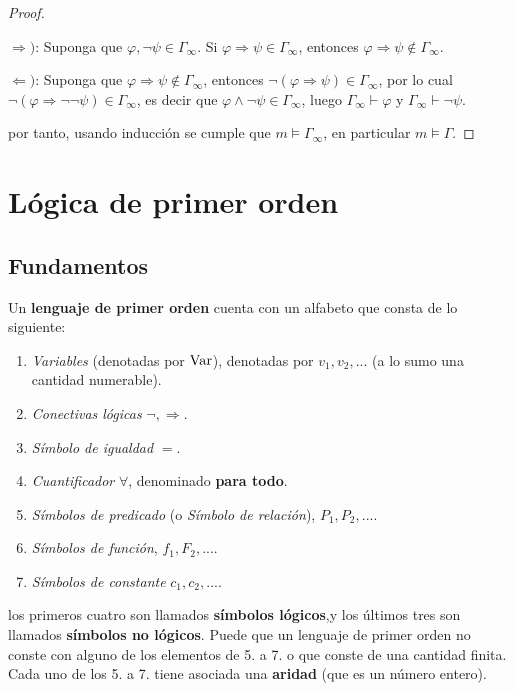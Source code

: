 \documentclass[12pt]{report}
\newcounter{it}
\theoremstyle{largebreak}
\begin{document}
\begin{proof}
\begin{enumerate}
            $\Rightarrow)$: Suponga que $\varphi,\neg\psi\in\Gamma_\infty$. Si $\varphi\Rightarrow\psi\in\Gamma_\infty$, entonces $\varphi\Rightarrow\psi\notin\Gamma_\infty$.

            $\Leftarrow)$: Suponga que $\varphi\Rightarrow\psi\notin\Gamma_\infty$, entonces $\neg(\varphi\Rightarrow\psi)\in\Gamma_\infty$, por lo cual $\neg(\varphi\Rightarrow\neg\neg \psi)\in\Gamma_\infty$, es decir que $\varphi\land\neg\psi\in\Gamma_\infty$, luego $\Gamma_\infty\vdash\varphi$ y $\Gamma_\infty\vdash\neg\psi$.
        \end{enumerate}
        por tanto, usando inducción se cumple que $m\vDash\Gamma_\infty$, en particular $m\vDash\Gamma$.
    \end{proof}

    \chapter{Lógica de primer orden}

    \section{Fundamentos}

    \begin{mydef}
        Un \textbf{lenguaje de primer orden} cuenta con un alfabeto que consta de lo siguiente:
        \begin{enumerate}
            \item \textit{Variables} (denotadas por $\textup{Var}$), denotadas por $v_1,v_2,...$ (a lo sumo una cantidad numerable).
            \item \textit{Conectivas lógicas} $\neg,\Rightarrow$.
            \item \textit{Símbolo de igualdad} $=$.
            \item \textit{Cuantificador} $\forall$, denominado \textbf{para todo}.
            \item \textit{Símbolos de predicado} (o \textit{Símbolo de relación}), $P_1,P_2,...$.
            \item \textit{Símbolos de función}, $f_1,F_2,...$.
            \item \textit{Símbolos de constante} $c_1,c_2,...$.
        \end{enumerate}
        los primeros cuatro son llamados \textbf{símbolos lógicos},y los últimos tres son llamados \textbf{símbolos no lógicos}. Puede que un lenguaje de primer orden no conste con alguno de los elementos de 5. a 7. o que conste de una cantidad finita. Cada uno de los 5. a 7. tiene asociada una \textbf{aridad} (que es un número entero).
    \end{mydef}
\end{document}
